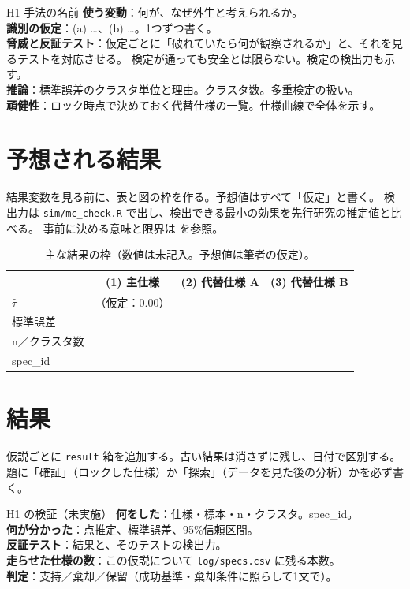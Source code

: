 \documentclass[a4paper,10pt]{ltjsarticle}
\begin{document}
\begin{design}{H1 手法の名前}
\textbf{使う変動}：何が、なぜ外生と考えられるか。\\
\textbf{識別の仮定}：(a) …、(b) …。1つずつ書く。\\
\textbf{脅威と反証テスト}：仮定ごとに「破れていたら何が観察されるか」と、それを見るテストを対応させる。
検定が通っても安全とは限らない。検定の検出力も示す\parencite{roth2022}。\\
\textbf{推論}：標準誤差のクラスタ単位と理由。クラスタ数。多重検定の扱い。\\
\textbf{頑健性}：ロック時点で決めておく代替仕様の一覧。仕様曲線で全体を示す\parencite{simonsohn2020}。
\end{design}

\section{予想される結果}\label{sec:expected}
結果変数を見る前に、表と図の枠を作る。予想値はすべて「仮定」と書く。
検出力は \texttt{sim/mc\_check.R} で出し、検出できる最小の効果を先行研究の推定値と比べる。
事前に決める意味と限界は \textcite{olken2015} を参照。

\begin{table}[htbp]
\centering\small
\begin{tabular}{lccc}
\toprule
 & (1) 主仕様 & (2) 代替仕様 A & (3) 代替仕様 B \\
\midrule
$\hat\tau$ & （仮定：0.00） & & \\
標準誤差 & & & \\
n／クラスタ数 & & & \\
spec\_id & & & \\
\bottomrule
\end{tabular}
\caption{主な結果の枠（数値は未記入。予想値は筆者の仮定）。}
\label{tab:shell}
\end{table}

\section{結果}\label{sec:result}
仮説ごとに \texttt{result} 箱を追加する。古い結果は消さずに残し、日付で区別する。
題に「確証」（ロックした仕様）か「探索」（データを見た後の分析）かを必ず書く。

\begin{result}{H1 の検証（未実施）}
\textbf{何をした}：仕様・標本・n・クラスタ。spec\_id。\\
\textbf{何が分かった}：点推定、標準誤差、95\%信頼区間。\\
\textbf{反証テスト}：結果と、そのテストの検出力。\\
\textbf{走らせた仕様の数}：この仮説について \texttt{log/specs.csv} に残る本数。\\
\textbf{判定}：支持／棄却／保留（成功基準・棄却条件に照らして1文で）。
\end{result}
\end{document}
